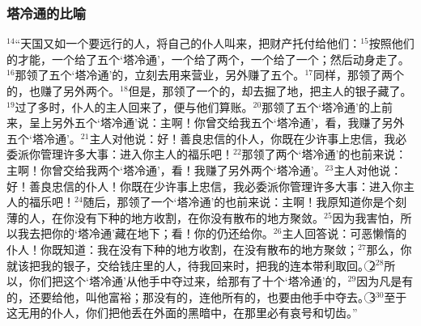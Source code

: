 \subsubsection{塔冷通的比喻}
$^{14}$“天国又如一个要远行的人，将自己的仆人叫来，把财产托付给他们：$^{15}$按照他们的才能，一个给了五个‘塔冷通’，一个给了两个，一个给了一个；然后动身走了。$^{16}$那领了五个‘塔冷通’的，立刻去用来营业，另外赚了五个。$^{17}$同样，那领了两个的，也赚了另外两个。$^{18}$但是，那领了一个的，却去掘了地，把主人的银子藏了。$^{19}$过了多时，仆人的主人回来了，便与他们算账。$^{20}$那领了五个‘塔冷通’的上前来，呈上另外五个‘塔冷通’说：主啊！你曾交给我五个‘塔冷通’，看，我赚了另外五个‘塔冷通’。$^{21}$主人对他说：好！善良忠信的仆人，你既在少许事上忠信，我必委派你管理许多大事：进入你主人的福乐吧！$^{22}$那领了两个‘塔冷通’的也前来说：主啊！你曾交给我两个‘塔冷通’，看！我赚了另外两个‘塔冷通’。$^{23}$主人对他说：好！善良忠信的仆人！你既在少许事上忠信，我必委派你管理许多大事：进入你主人的福乐吧！$^{24}$随后，那领了一个‘塔冷通’的也前来说：主啊！我原知道你是个刻薄的人，在你没有下种的地方收割，在你没有散布的地方聚敛。$^{25}$因为我害怕，所以我去把你的‘塔冷通’藏在地下；看！你的仍还给你。$^{26}$主人回答说：可恶懒惰的仆人！你既知道：我在没有下种的地方收割，在没有散布的地方聚敛；$^{27}$那么，你就该把我的银子，交给钱庄里的人，待我回来时，把我的连本带利取回。\textcircled{2}$^{28}$所以，你们把这个‘塔冷通’从他手中夺过来，给那有了十个‘塔冷通’的，$^{29}$因为凡是有的，还要给他，叫他富裕；那没有的，连他所有的，也要由他手中夺去。\textcircled{3}$^{30}$至于这无用的仆人，你们把他丢在外面的黑暗中，在那里必有哀号和切齿。”


